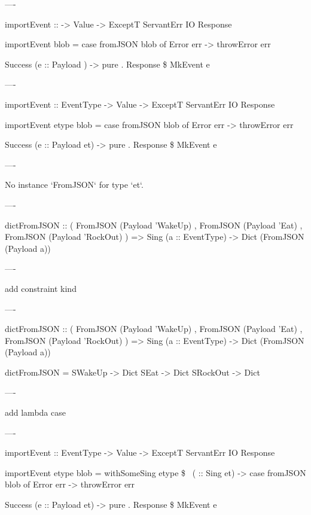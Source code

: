 ----

\begin{raw}
  importEvent :: 
              -> Value
              -> ExceptT ServantErr IO Response

  importEvent  blob =
    case fromJSON blob of
      Error err ->
        throwError err

      Success (e :: Payload ) ->
        pure . Response \$ MkEvent e
\end{raw}

----

\begin{raw}
  importEvent :: EventType
              -> Value
              -> ExceptT ServantErr IO Response

  importEvent etype blob =
      case fromJSON blob of
        Error err ->
          throwError err

        Success (e :: Payload et) ->
          pure . Response \$ MkEvent e
\end{raw}

----

No instance `FromJSON` for type `et`.

----

\begin{hs}
  dictFromJSON :: ( FromJSON (Payload 'WakeUp)
                  , FromJSON (Payload 'Eat)
                  , FromJSON (Payload 'RockOut)
                  )
               => Sing (a :: EventType)
               -> Dict (FromJSON (Payload a))
\end{hs}

----

add constraint kind

----

\begin{hs}
  dictFromJSON :: ( FromJSON (Payload 'WakeUp)
                  , FromJSON (Payload 'Eat)
                  , FromJSON (Payload 'RockOut)
                  )
               => Sing (a :: EventType)
               -> Dict (FromJSON (Payload a))

  dictFromJSON = \case
    SWakeUp  -> Dict
    SEat     -> Dict
    SRockOut -> Dict
\end{hs}

----

add lambda case

----

\begin{raw}
  importEvent :: EventType
              -> Value
              -> ExceptT ServantErr IO Response

  importEvent etype blob =
    withSomeSing etype \$ \ ( :: Sing et) ->
          case fromJSON blob of
            Error err ->
              throwError err

            Success (e :: Payload et) ->
              pure . Response \$ MkEvent e
\end{raw}

